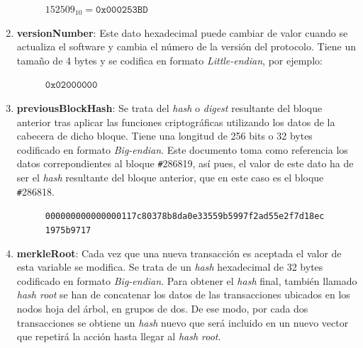 \documentclass{article}
\begin{document}
\begin{enumerate}
        \begin{figure}[H]
        \centering
            $152509_{10} = \texttt{0x000253BD}$
        \end{figure}
        
        \item \textbf{versionNumber}: Este dato hexadecimal puede cambiar de valor cuando se actualiza el software y cambia el número de la versión del protocolo. Tiene un tamaño de 4 bytes y se codifica en formato \textit{Little-endian}, por ejemplo:
        
        \begin{figure}[H]
        \centering
            $\texttt{0x02000000}$
        \end{figure}
        
        \item \textbf{previousBlockHash}: Se trata del \textit{hash} o \textit{digest} resultante del bloque anterior tras aplicar las funciones criptográficas utilizando los datos de la cabecera de dicho bloque. Tiene una longitud de 256 bits o 32 bytes codificado en formato \textit{Big-endian}. Este documento toma como referencia los datos correpondientes al bloque \texttt{\#}286819, así pues, el valor de este dato ha de ser el \textit{hash} resultante del bloque anterior, que en este caso es el bloque \texttt{\#}286818.
        
        \begin{figure}[H]
        \centering
        \scriptsize{
            \texttt{000000000000000117c80378b8da0e33559b5997f2ad55e2f7d18ec1975b9717}
        }
        \end{figure}
        
        \item \textbf{merkleRoot}: Cada vez que una nueva transacción es aceptada el valor de esta variable se modifica. Se trata de un \textit{hash} hexadecimal de 32 bytes codificado en formato \textit{Big-endian}. Para obtener el \textit{hash} final, también llamado \textit{hash root} se han de concatenar los datos de las transacciones ubicados en los nodos hoja del árbol, en grupos de dos. De ese modo, por cada dos transacciones se obtiene un \textit{hash} nuevo que será incluido en un nuevo vector que repetirá la acción hasta llegar al \textit{hash root}.
        

\end{enumerate}
\end{document}
